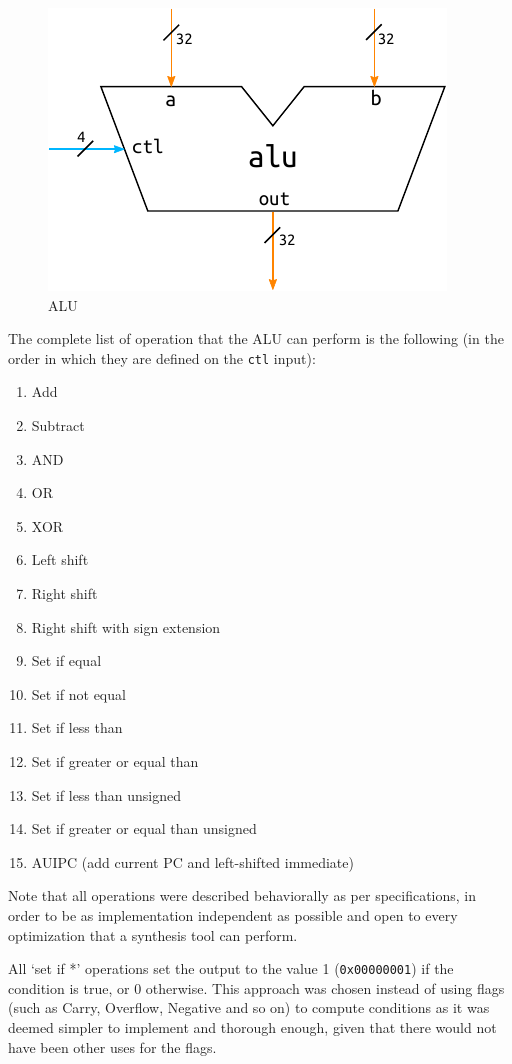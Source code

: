 \documentclass[a4paper]{article}
\begin{document}
\begin{figure}[hbtp]
    \centering
    \includegraphics[]{../alu/ref/schematic/alu.pdf}
    \caption{ALU}
    \label{fig:alu}
\end{figure}

The complete list of operation that the ALU can perform is the following (in the order in which they are defined on the \texttt{ctl} input):
\begin{enumerate}
    \item Add
    \item Subtract
    \item AND
    \item OR
    \item XOR
    \item Left shift
    \item Right shift
    \item Right shift with sign extension
    \item Set if equal
    \item Set if not equal
    \item Set if less than
    \item Set if greater or equal than
    \item Set if less than unsigned
    \item Set if greater or equal than unsigned
    \item AUIPC (add current PC and left-shifted immediate)
\end{enumerate}

Note that all operations were described behaviorally as per specifications, in order to be as implementation independent as possible and open to every optimization that a synthesis tool can perform.

All `set if *' operations set the output to the value 1 (\texttt{0x00000001}) if the condition is true, or 0 otherwise. This approach was chosen instead of using flags (such as Carry, Overflow, Negative and so on) to compute conditions as it was deemed simpler to implement and thorough enough, given that there would not have been other uses for the flags.
\end{document}
